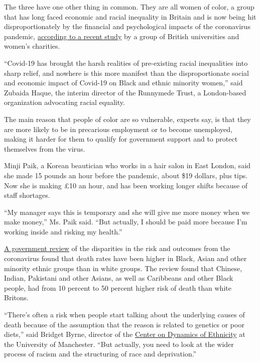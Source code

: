The three have one other thing in common. They are all women of color, a
group that has long faced economic and racial inequality in Britain and
is now being hit disproportionately by the financial and psychological
impacts of the coronavirus pandemic,
\href{https://www.fawcettsociety.org.uk/Handlers/Download.ashx?IDMF=cae4917f-1df3-4ab8-94e7-550c23bdc9cf}{according
to a recent study} by a group of British universities and women's
charities.

``Covid-19 has brought the harsh realities of pre-existing racial
inequalities into sharp relief, and nowhere is this more manifest than
the disproportionate social and economic impact of Covid-19 on Black and
ethnic minority women,'' said Zubaida Haque, the interim director of the
Runnymede Trust, a London-based organization advocating racial equality.

The main reason that people of color are so vulnerable, experts say, is
that they are more likely to be in precarious employment or to become
unemployed, making it harder for them to qualify for government support
and to protect themselves from the virus.

Minji Paik, a Korean beautician who works in a hair salon in East
London, said she made 15 pounds an hour before the pandemic, about \$19
dollars, plus tips. Now she is making £10 an hour, and has been working
longer shifts because of staff shortages.

``My manager says this is temporary and she will give me more money when
we make money,'' Ms. Paik said. ``But actually, I should be paid more
because I'm working inside and risking my health.''

\href{https://www.gov.uk/government/publications/covid-19-understanding-the-impact-on-bame-communities}{A
government review} of the disparities in the risk and outcomes from the
coronavirus found that death rates have been higher in Black, Asian and
other minority ethnic groups than in white groups. The review found that
Chinese, Indian, Pakistani and other Asians, as well as Caribbeans and
other Black people, had from 10 percent to 50 percent higher risk of
death than white Britons.

``There's often a risk when people start talking about the underlying
causes of death because of the assumption that the reason is related to
genetics or poor diets,'' said Bridget Byrne, director of the
\href{https://www.ethnicity.ac.uk/}{Center on Dynamics of Ethnicity} at
the University of Manchester. ``But actually, you need to look at the
wider process of racism and the structuring of race and deprivation.''

